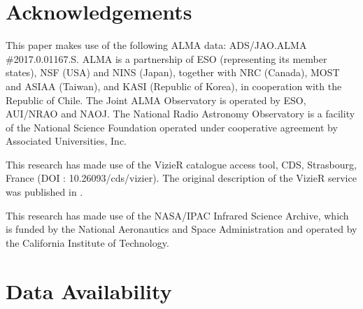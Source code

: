 \documentclass[letters,usenatbib,times]{mnras}
\begin{document}
 \section*{Acknowledgements}

This paper makes use of the following ALMA data: ADS/JAO.ALMA \#2017.0.01167.S. ALMA is a partnership of ESO (representing its member states), NSF (USA) and NINS (Japan), together with NRC (Canada), MOST and ASIAA (Taiwan), and KASI (Republic of Korea), in cooperation with the Republic of Chile. The Joint ALMA Observatory is operated by ESO, AUI/NRAO and NAOJ. The National Radio Astronomy Observatory is a facility of the National Science Foundation operated under cooperative agreement by Associated Universities, Inc.
 
This research has made use of the VizieR catalogue access tool, CDS, Strasbourg, France (DOI : 10.26093/cds/vizier). The original description of the VizieR service was published in \citet{2000A&AS..143...23O}.

This research has made use of the NASA/IPAC Infrared Science Archive, which is funded by the National Aeronautics and Space Administration and operated by the California Institute of Technology.

\section*{Data Availability}











\bsp	%
\label{lastpage}
\end{document}
